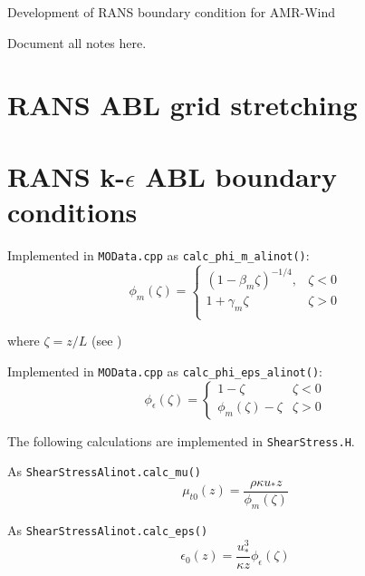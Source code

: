 \documentclass{article}
\begin{document}
\begin{center}
{\Large{}Development of RANS boundary condition for
  AMR-Wind}{\Large\par} \par\end{center}

Document all notes here.

\section{RANS ABL grid stretching}

\section{RANS k-$\epsilon$ ABL boundary conditions}

Implemented in \texttt{MOData.cpp} as \texttt{calc\_phi\_m\_alinot()}: 
\begin{equation}
\phi_m\left(\zeta \right) =
\begin{cases}
\left( 1 - \beta_m \zeta \right)^{-1/4}, & \zeta < 0\\
1+ \gamma_m \zeta                       & \zeta > 0\\
\end{cases}
\end{equation}

where $\zeta=z/L$ (see \cite{alinot2005k})

Implemented in \texttt{MOData.cpp} as \texttt{calc\_phi\_eps\_alinot()}: 
\begin{equation}
  \phi_\epsilon\left( \zeta \right) =
  \begin{cases}
    1-\zeta                            & \zeta < 0\\
    \phi_m\left( \zeta \right) - \zeta & \zeta > 0
  \end{cases}
  \end{equation}

The following calculations are implemented in \texttt{ShearStress.H}.

As \texttt{ShearStressAlinot.calc\_mu()}
\begin{equation}
  \mu_{t0}(z) = \frac{\rho \kappa u_* z}{\phi_m(\zeta)}
\end{equation}

As \texttt{ShearStressAlinot.calc\_eps()}
\begin{equation}
  \epsilon_0(z) = \frac{u_*^3}{\kappa z} \phi_\epsilon(\zeta)
\end{equation}
\end{document}
